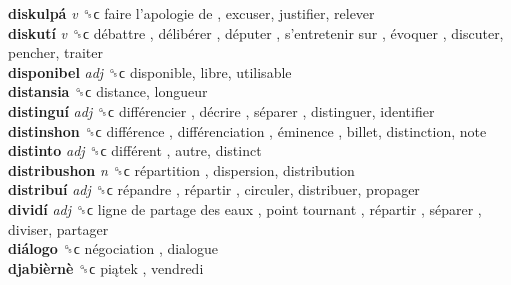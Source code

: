 \textbf{diskulpá} \emph{v}  ␝ϲ   faire l’apologie de , excuser, justifier, relever  \\
\textbf{diskutí} \emph{v}  ␝ϲ   débattre ,  délibérer ,  députer ,  s’entretenir sur ,  évoquer , discuter, pencher, traiter  \\
\textbf{disponibel} \emph{adj}  ␝ϲ  disponible, libre, utilisable  \\
\textbf{distansia} ␝ϲ  distance, longueur  \\
\textbf{distinguí} \emph{adj}  ␝ϲ   différencier ,  décrire ,  séparer , distinguer, identifier  \\
\textbf{distinshon} ␝ϲ   différence ,  différenciation ,  éminence , billet, distinction, note  \\
\textbf{distinto} \emph{adj}  ␝ϲ   différent , autre, distinct  \\
\textbf{distribushon} \emph{n}  ␝ϲ   répartition , dispersion, distribution  \\
\textbf{distribuí} \emph{adj}  ␝ϲ   répandre ,  répartir , circuler, distribuer, propager  \\
\textbf{dividí} \emph{adj}  ␝ϲ   ligne de partage des eaux ,  point tournant ,  répartir ,  séparer , diviser, partager  \\
\textbf{diálogo} ␝ϲ   négociation , dialogue  \\
\textbf{djabièrnè} ␝ϲ   piątek , vendredi  \\
